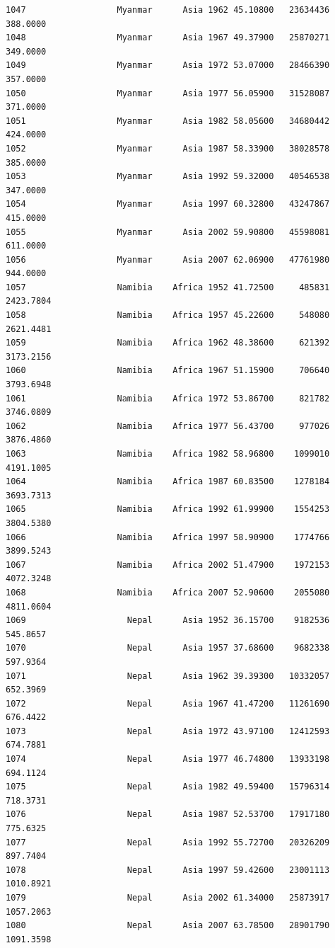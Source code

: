\documentclass[
  letterpaper,
  DIV=11,
  numbers=noendperiod]{scrreprt}
\begin{document}
\begin{verbatim}
1047                  Myanmar      Asia 1962 45.10800   23634436    388.0000
1048                  Myanmar      Asia 1967 49.37900   25870271    349.0000
1049                  Myanmar      Asia 1972 53.07000   28466390    357.0000
1050                  Myanmar      Asia 1977 56.05900   31528087    371.0000
1051                  Myanmar      Asia 1982 58.05600   34680442    424.0000
1052                  Myanmar      Asia 1987 58.33900   38028578    385.0000
1053                  Myanmar      Asia 1992 59.32000   40546538    347.0000
1054                  Myanmar      Asia 1997 60.32800   43247867    415.0000
1055                  Myanmar      Asia 2002 59.90800   45598081    611.0000
1056                  Myanmar      Asia 2007 62.06900   47761980    944.0000
1057                  Namibia    Africa 1952 41.72500     485831   2423.7804
1058                  Namibia    Africa 1957 45.22600     548080   2621.4481
1059                  Namibia    Africa 1962 48.38600     621392   3173.2156
1060                  Namibia    Africa 1967 51.15900     706640   3793.6948
1061                  Namibia    Africa 1972 53.86700     821782   3746.0809
1062                  Namibia    Africa 1977 56.43700     977026   3876.4860
1063                  Namibia    Africa 1982 58.96800    1099010   4191.1005
1064                  Namibia    Africa 1987 60.83500    1278184   3693.7313
1065                  Namibia    Africa 1992 61.99900    1554253   3804.5380
1066                  Namibia    Africa 1997 58.90900    1774766   3899.5243
1067                  Namibia    Africa 2002 51.47900    1972153   4072.3248
1068                  Namibia    Africa 2007 52.90600    2055080   4811.0604
1069                    Nepal      Asia 1952 36.15700    9182536    545.8657
1070                    Nepal      Asia 1957 37.68600    9682338    597.9364
1071                    Nepal      Asia 1962 39.39300   10332057    652.3969
1072                    Nepal      Asia 1967 41.47200   11261690    676.4422
1073                    Nepal      Asia 1972 43.97100   12412593    674.7881
1074                    Nepal      Asia 1977 46.74800   13933198    694.1124
1075                    Nepal      Asia 1982 49.59400   15796314    718.3731
1076                    Nepal      Asia 1987 52.53700   17917180    775.6325
1077                    Nepal      Asia 1992 55.72700   20326209    897.7404
1078                    Nepal      Asia 1997 59.42600   23001113   1010.8921
1079                    Nepal      Asia 2002 61.34000   25873917   1057.2063
1080                    Nepal      Asia 2007 63.78500   28901790   1091.3598

\end{verbatim}
\end{document}
